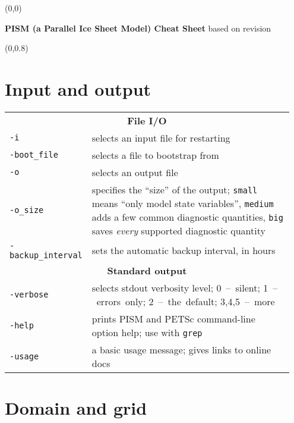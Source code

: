 \documentclass[landscape]{article}
\newcommand{\PISMREV}{revision }
\newcommand{\tabletitle}[1]{\multicolumn{2}{c}{\textbf{#1}}}
\begin{document}
\pagestyle{empty}

\begin{textblock}{47}(0,0)
  \begin{center}
    \Large{\textbf{PISM (a Parallel Ice Sheet Model) Cheat Sheet} based on \PISMREV}
  \end{center}
\end{textblock}

\begin{textblock}{15}(0,0.8)
\section{Input and output}
\label{sec:input-output}

\begin{tabular}{@{}p{0.2\linewidth}p{0.75\linewidth}@{}}
\tabletitle{File I/O} \\
\texttt{-i} & selects an input file for restarting \\
\texttt{-boot_file} & selects a file to bootstrap from \\
\texttt{-o} & selects an output file \\
\texttt{-o_size} & specifies the ``size'' of the output; \texttt{small} means
``only model state variables'', \texttt{medium} adds a few common
diagnostic quantities, \texttt{big} saves \emph{every} supported diagnostic quantity\\
\texttt{-backup_interval} & sets the automatic backup interval, in hours\\
\tabletitle{Standard output} \\
\texttt{-verbose} & selects stdout verbosity level; \mbox{0 -- silent}; \mbox{1 --
errors only}; \mbox{2 -- the default}; \mbox{3,4,5 -- more}\\
\texttt{-help} & prints PISM and PETSc command-line option help; use with \texttt{grep}\\
\texttt{-usage} & a basic usage message; gives links to online docs\\
\end{tabular}

\section{Domain and grid}
\label{sec:grid-setup}
  

\end{textblock}
\end{document}
